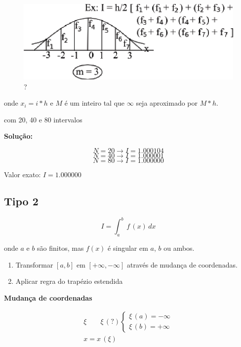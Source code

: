 \begin{figure}[htp]
 \centering
 \includegraphics[scale=1.0]{capitulos/capitulo2/figuras/int_func_lim_inf2.eps}
 \caption{?}
 \label{fig:int_func_lim_inf2}
\end{figure}

onde $x_{i} = i \ast h$ e $M$ é um inteiro tal que $\infty$ seja aproximado por $M \ast h$.

\begin{example}
  com 20, 40 e 80 intervalos

\textbf{Solução:} 

\[N = 20 \rightarrow I = 1.000104\]
\[N = 40 \rightarrow I = 1.000001\]
\[N = 80 \rightarrow I = 1.000000\]

Valor exato: $I = 1.000000$
\end{example}

\subsection{Tipo 2}

\[
 I = \int_a^b \, f\,(x) \, dx
\]

onde $a$ e $b$ são finitos, mas $f(x)$ é singular em $a$, $b$ ou ambos.

\begin{enumerate}

\item 
Transformar $[a,b]$ em $[+\infty,-\infty]$ através de mudança de coordenadas.

\item
Aplicar regra do trapézio estendida

\end{enumerate}

\textbf{Mudança de coordenadas}

\[
 \begin{array}{l}
 \xi \qquad \xi\,(?)
 \left\{
 \begin{array}{l}
  \xi\,(a) = - \infty \\
  \xi\,(b) = + \infty
 \end{array}
 \right. \\
 x = x\,(\xi)
 \end{array}
\]

